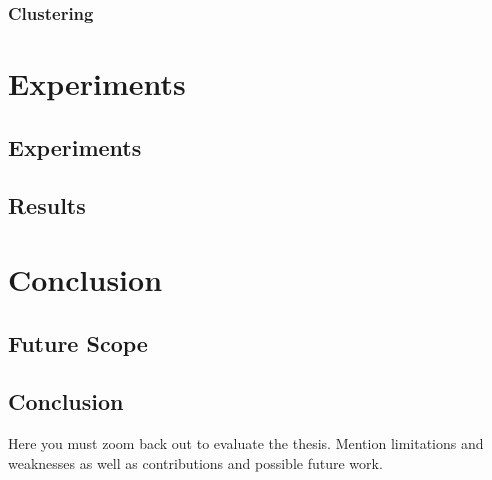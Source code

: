 \documentclass[a4paper,12pt]{Classes/RoboticsLaTeX}
\begin{document}
	\subsection{Clustering}

	
	\chapter{Experiments}

	\section{Experiments}
	\section{Results}

	\chapter{Conclusion}
	\label{chap:conclusion}
	\section{Future Scope}
	\section{Conclusion}

	
	Here you must zoom back out to evaluate the thesis. Mention limitations and weaknesses as well as contributions and possible future work.
	
	 
	\renewcommand{\bibname}{References}           %
	
	
	
	
\end{document}
